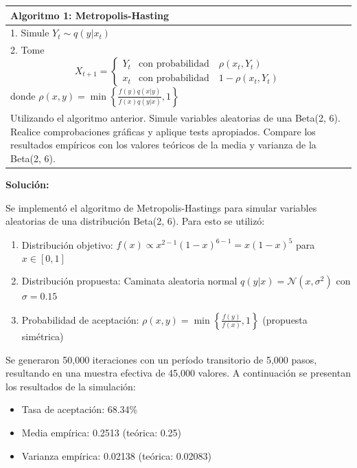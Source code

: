 \documentclass[12pt,a4paper]{article}
\begin{document}
\begin{center}
\begin{tabular}{|p{\textwidth}|}
\hline
\textbf{Algoritmo 1:} Metropolis-Hasting \\
\hline
1. Simule $Y_t \sim q(y|x_t)$ \\[0.5em]
2. Tome 
\begin{equation*}
X_{t+1} = \begin{cases}
Y_t & \text{con probabilidad} \quad \rho(x_t, Y_t) \\
x_t & \text{con probabilidad} \quad 1 - \rho(x_t, Y_t)
\end{cases}
\end{equation*}
donde $\rho(x, y) = \min\left\{\frac{f(y)q(x|y)}{f(x)q(y|x)}, 1\right\}$ \\
\hline

Utilizando el algoritmo anterior. Simule variables aleatorias de una Beta(2, 6). Realice comprobaciones gráficas y aplique tests apropiados. Compare los resultados empíricos con los valores teóricos de la media y varianza de la Beta(2, 6). \\
\hline
\end{tabular}

\end{center}

\textbf{Solución:}

Se implementó el algoritmo de Metropolis-Hastings para simular variables aleatorias de una distribución Beta(2, 6). Para esto se utilizó:

\begin{enumerate}
    \item Distribución objetivo: $f(x) \propto x^{2-1}(1-x)^{6-1} = x(1-x)^5$ para $x \in [0,1]$
    \item Distribución propuesta: Caminata aleatoria normal $q(y|x) = \mathcal{N}(x, \sigma^2)$ con $\sigma = 0.15$
    \item Probabilidad de aceptación: $\rho(x,y) = \min\left\{\frac{f(y)}{f(x)}, 1\right\}$ (propuesta simétrica)
\end{enumerate}

Se generaron 50,000 iteraciones con un período transitorio de 5,000 pasos, resultando en una muestra efectiva de 45,000 valores. A continuación se presentan los resultados de la simulación:

\begin{itemize}
    \item Tasa de aceptación: 68.34\%
    \item Media empírica: 0.2513 (teórica: 0.25)
    \item Varianza empírica: 0.02138 (teórica: 0.02083)
\end{itemize}
\end{document}
